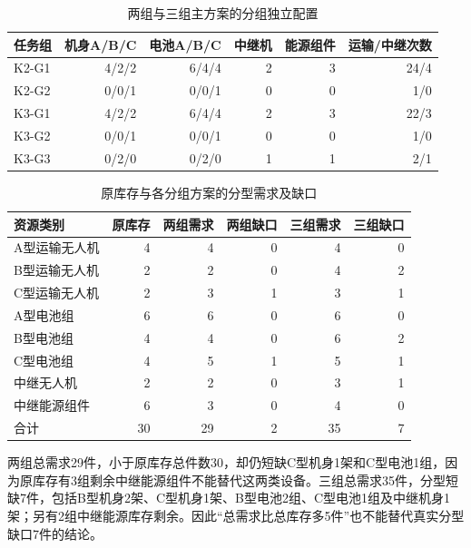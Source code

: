 \documentclass[a4paper]{my_paper}%
\numberwithin{equation}{section}
\newcommand{\srcnote}[1]{\par\vspace{2pt}{\footnotesize\raggedright #1\par}}
\theoremstyle{definition}
\begin{document}
\begin{table}[htbp]\centering\small
\caption{两组与三组主方案的分组独立配置}\label{tab:groupalloc}
\setlength{\tabcolsep}{4pt}\renewcommand{\arraystretch}{1.12}
\begin{tabular}{@{}lrrrrr@{}}\toprule
任务组 & 机身A/B/C & 电池A/B/C & 中继机 & 能源组件 & 运输/中继次数\\
\midrule
K2-G1 & 4/2/2 & 6/4/4 & 2 & 3 & 24/4\\
K2-G2 & 0/0/1 & 0/0/1 & 0 & 0 & 1/0\\
K3-G1 & 4/2/2 & 6/4/4 & 2 & 3 & 22/3\\
K3-G2 & 0/0/1 & 0/0/1 & 0 & 0 & 1/0\\
K3-G3 & 0/2/0 & 0/2/0 & 1 & 1 & 2/1\\
\bottomrule\end{tabular}
\srcnote{K2-G1为除S006外全部区域，K2-G2为S006；K3-G1为大分量，K3-G2为S006，K3-G3为S007。表列中继次数为源任务唯一执行次数，额外复制次数为0。}
\end{table}

\begin{table}[htbp]\centering\small
\caption{原库存与各分组方案的分型需求及缺口}\label{tab:q4inventory}
\setlength{\tabcolsep}{5pt}\renewcommand{\arraystretch}{1.12}
\begin{tabular}{@{}lrrrrr@{}}\toprule
资源类别 & 原库存 & 两组需求 & 两组缺口 & 三组需求 & 三组缺口\\
\midrule
A型运输无人机 & 4 & 4 & 0 & 4 & 0\\
B型运输无人机 & 2 & 2 & 0 & 4 & 2\\
C型运输无人机 & 2 & 3 & 1 & 3 & 1\\
A型电池组 & 6 & 6 & 0 & 6 & 0\\
B型电池组 & 4 & 4 & 0 & 6 & 2\\
C型电池组 & 4 & 5 & 1 & 5 & 1\\
中继无人机 & 2 & 2 & 0 & 3 & 1\\
中继能源组件 & 6 & 3 & 0 & 4 & 0\\
合计 & 30 & 29 & 2 & 35 & 7\\
\bottomrule\end{tabular}
\srcnote{无人机以架计，电池/能源以组计；合计仅用于配置规模比较，不作货币成本。}
\end{table}


两组总需求29件，小于原库存总件数30，却仍短缺C型机身1架和C型电池1组，因为原库存有3组剩余中继能源组件不能替代这两类设备。三组总需求35件，分型短缺7件，包括B型机身2架、C型机身1架、B型电池2组、C型电池1组及中继机身1架；另有2组中继能源库存剩余。因此“总需求比总库存多5件”也不能替代真实分型缺口7件的结论。
\end{document}
